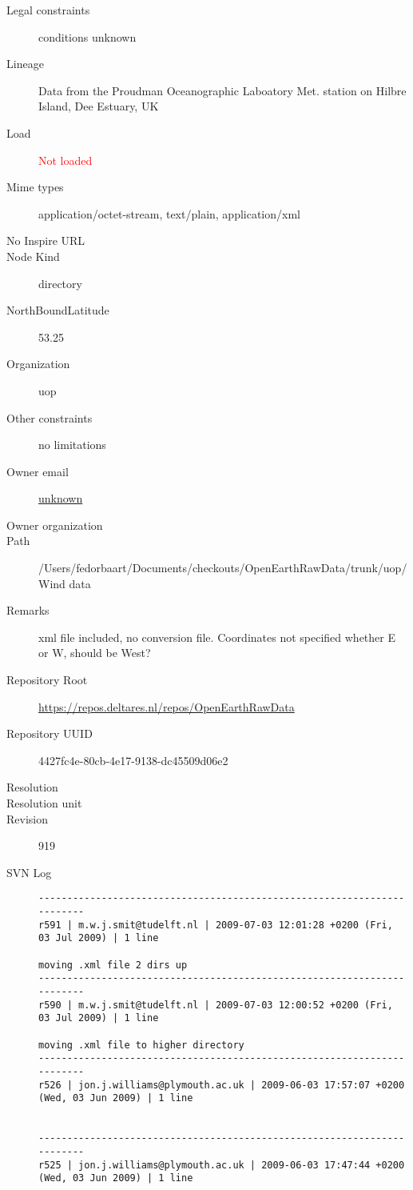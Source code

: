 \documentclass[9]{report}
\begin{document}
\begin{description}
  \item[Legal constraints] conditions unknown
  \item[Lineage] Data from the Proudman Oceanographic Laboatory Met. station on Hilbre Island, Dee Estuary, UK
  \item[Load] \textcolor{red}{Not loaded}
  \item[Mime types] application/octet-stream, text/plain, application/xml
  \item[No Inspire URL] 
  \item[Node Kind] directory
  \item[NorthBoundLatitude] 53.25
  \item[Organization] uop
  \item[Other constraints] no limitations
  \item[Owner email] \href{mailto:unknown}{unknown}
  \item[Owner organization] 
  \item[Path] /Users/fedorbaart/Documents/checkouts/OpenEarthRawData/trunk/uop/Wind data
  \item[Remarks] xml file included, no conversion file. Coordinates not specified whether E or W, should be West?
  \item[Repository Root] \href{https://repos.deltares.nl/repos/OpenEarthRawData}{https://repos.deltares.nl/repos/OpenEarthRawData}
  \item[Repository UUID] 4427fc4e-80cb-4e17-9138-dc45509d06e2
  \item[Resolution] 
  \item[Resolution unit] 
  \item[Revision] 919
  \item[SVN Log] \begin{verbatim}
------------------------------------------------------------------------
r591 | m.w.j.smit@tudelft.nl | 2009-07-03 12:01:28 +0200 (Fri, 03 Jul 2009) | 1 line

moving .xml file 2 dirs up
------------------------------------------------------------------------
r590 | m.w.j.smit@tudelft.nl | 2009-07-03 12:00:52 +0200 (Fri, 03 Jul 2009) | 1 line

moving .xml file to higher directory
------------------------------------------------------------------------
r526 | jon.j.williams@plymouth.ac.uk | 2009-06-03 17:57:07 +0200 (Wed, 03 Jun 2009) | 1 line


------------------------------------------------------------------------
r525 | jon.j.williams@plymouth.ac.uk | 2009-06-03 17:47:44 +0200 (Wed, 03 Jun 2009) | 1 line



\end{verbatim}
\end{description}
\end{document}
